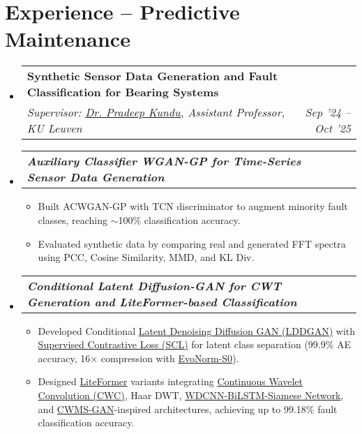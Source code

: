 \documentclass[letterpaper,11pt]{article}
\makeatletter
\newcommand{\resumeItem}[1]{
  \item \small{#1\vspace{-2pt}}
}
\newcommand{\resumeSubheading}[4]{
  \vspace{0pt}\item
  \begin{tabular*}{0.97\textwidth}[t]{l@{\extracolsep{\fill}}r}
    \textbf{#1} & \textbf{#2} \\
    \textit{\small #3} & \textit{\small #4} \\
  \end{tabular*}\vspace{-6pt}
}
\newcommand{\resumeSubSubheading}[2]{
  \vspace{0pt}\item
  \begin{tabular*}{0.97\textwidth}[t]{l@{\extracolsep{\fill}}r}
    \textit{\small #1} & \textit{\small #2} \\
  \end{tabular*}\vspace{-6pt}
}
\newcommand{\resumeSubHeadingListStart}{
  \begin{itemize}[leftmargin=0.10in, label={}]\vspace{6pt}
}
\newcommand{\resumeSubHeadingListEnd}{
  \end{itemize}
}
\newcommand{\resumeItemListStart}{
  \begin{itemize}[leftmargin=0.18in]
}
\newcommand{\resumeItemListEnd}{
  \end{itemize}\vspace{-6pt}
}
\makeatother
\begin{document}
\section{Experience -- Predictive Maintenance}
\resumeSubHeadingListStart
  \resumeSubheading
    {Synthetic Sensor Data Generation and Fault Classification for Bearing Systems}{}
    {Supervisor: {\color{blue}\href{https://www.kuleuven.be/wieiswie/en/person/00155770}{Dr. Pradeep Kundu,}} Assistant Professor, KU Leuven}{Sep '24 -- Oct '25}

  \resumeSubSubheading
    {\textbf{\hspace{4pt}Auxiliary Classifier WGAN-GP for Time-Series Sensor Data Generation} {\color{blue}\href{https://github.com/Ritabrata-Chakraborty/An-Efficient-Approach-for-Synthetic-Data-Generation-and-Fault-Diagnosis-for-Rotating-Machinery}{\faExternalLink*}}}{}
  \resumeItemListStart
    \resumeItem{Built ACWGAN-GP with TCN discriminator to augment minority fault classes, reaching $\sim$100\% classification accuracy.}
    \resumeItem{Evaluated synthetic data by comparing real and generated FFT spectra using PCC, Cosine Similarity, MMD, and KL Div.}
  \resumeItemListEnd

  \resumeSubSubheading
    {\textbf{\hspace{4pt}Conditional Latent Diffusion-GAN for CWT Generation and LiteFormer-based Classification}}{}
  \resumeItemListStart
    \resumeItem{Developed Conditional {\color{blue}\href{https://ieeexplore.ieee.org/document/10540088}{Latent Denoising Diffusion GAN (LDDGAN)}} with {\color{blue}\href{https://arxiv.org/abs/2004.11362}{Supervised Contrastive Loss (SCL)}} for latent class separation (99.9\% AE accuracy, 16× compression with {\color{blue}\href{https://arxiv.org/abs/2004.02967}{EvoNorm-S0}}).}
    \resumeItem{Designed {\color{blue}\href{https://ieeexplore.ieee.org/document/10294257}{LiteFormer}} variants integrating {\color{blue}\href{https://arxiv.org/pdf/1911.07925}{Continuous Wavelet Convolution (CWC)}}, Haar DWT, {\color{blue}\href{https://www.researchgate.net/publication/394458522_Rolling_bearing_fault_diagnosis_under_small_sample_conditions_based_on_WDCNN-BiLSTM_Siamese_network}{WDCNN-BiLSTM-Siamese Network}}, and {\color{blue}\href{https://journals.plos.org/plosone/article?id=10.1371/journal.pone.0319202}{CWMS-GAN}}-inspired architectures, achieving up to 99.18\% fault classification accuracy.}
  \resumeItemListEnd
\resumeSubHeadingListEnd   
\end{document}
